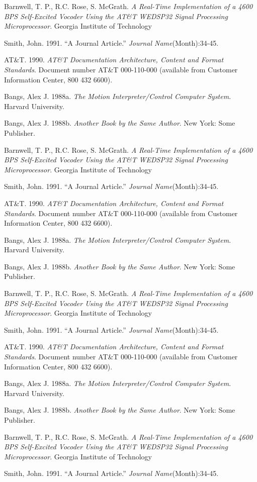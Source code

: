 \begin{thebibliography}{99}
Barnwell, T. P., R.C. Rose, S. McGrath. {\it A Real-Time
Implementation of a 4600 BPS Self-Excited Vocoder Using the AT\&T
WE\regmark DSP32 Signal Processing Microprocessor}.  Georgia Institute
of Technology


Smith, John. 1991. ``A Journal Article.'' {\it Journal Name}(Month):34-45.


AT\&T. 1990. {\it AT\&T Documentation Architecture, Content and Format
Standards}.  Document number AT\&T 000-110-000 (available from
Customer Information Center, 800 432 6600).

Bangs, Alex J. 1988a. {\it The Motion Interpreter/Control Computer
System}. Harvard University.


Bangs, Alex J. 1988b. {\it Another Book by the Same Author}. New York:
Some Publisher.


Barnwell, T. P., R.C. Rose, S. McGrath. {\it A Real-Time
Implementation of a 4600 BPS Self-Excited Vocoder Using the AT\&T
WE\regmark DSP32 Signal Processing Microprocessor}.  Georgia Institute
of Technology


Smith, John. 1991. ``A Journal Article.'' {\it Journal Name}(Month):34-45.

AT\&T. 1990. {\it AT\&T Documentation Architecture, Content and Format
Standards}.  Document number AT\&T 000-110-000 (available from
Customer Information Center, 800 432 6600).

Bangs, Alex J. 1988a. {\it The Motion Interpreter/Control Computer
System}. Harvard University.


Bangs, Alex J. 1988b. {\it Another Book by the Same Author}. New York:
Some Publisher.


Barnwell, T. P., R.C. Rose, S. McGrath. {\it A Real-Time
Implementation of a 4600 BPS Self-Excited Vocoder Using the AT\&T
WE\regmark DSP32 Signal Processing Microprocessor}.  Georgia Institute
of Technology


Smith, John. 1991. ``A Journal Article.'' {\it Journal Name}(Month):34-45.

AT\&T. 1990. {\it AT\&T Documentation Architecture, Content and Format
Standards}.  Document number AT\&T 000-110-000 (available from
Customer Information Center, 800 432 6600).

Bangs, Alex J. 1988a. {\it The Motion Interpreter/Control Computer
System}. Harvard University.


Bangs, Alex J. 1988b. {\it Another Book by the Same Author}. New York:
Some Publisher.


Barnwell, T. P., R.C. Rose, S. McGrath. {\it A Real-Time
Implementation of a 4600 BPS Self-Excited Vocoder Using the AT\&T
WE\regmark DSP32 Signal Processing Microprocessor}.  Georgia Institute
of Technology


Smith, John. 1991. ``A Journal Article.'' {\it Journal Name}(Month):34-45.
\end{thebibliography}
\tableofcontents
\listoffigures
\listoftables
